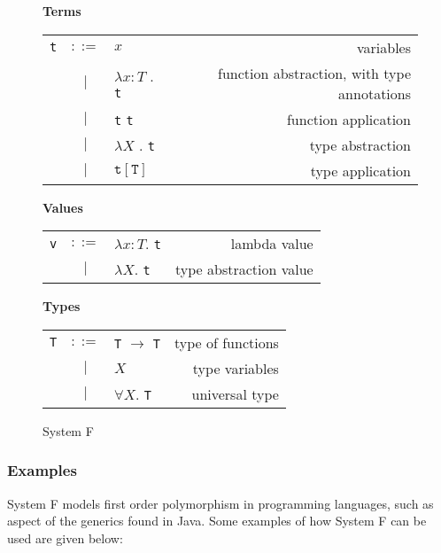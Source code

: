\begin{figure}[H]\label{fig:systemF}
    \centering
    \vspace{1cm}
    \textbf{Terms} \\
    \begin{tabular}{l c p{3cm} r}
        \texttt{t} & $ ::= $ & $ x $ &                   variables \\
      & $ | $ & $ \lambda x : T $ . \texttt{t} &          function abstraction, with type annotations \\
      & $ | $ & \texttt{t} \texttt{t} &          function application \\
      & $ | $ & $ \lambda X $ . \texttt{t} &          type abstraction \\
      & $ | $ & $ \texttt{t} [\texttt{T}] $ &          type application \\
    \end{tabular}

    \vspace{1cm}
    \textbf{Values} \\
    \begin{tabular}{l c p{3cm} r}
        \texttt{v} & $ ::= $ & $ \lambda x : T . $ \texttt{t} &                   lambda value \\
      & $ | $ & $ \lambda X . $ \texttt{t} &   type abstraction value \\
    \end{tabular}

    \vspace{1cm}
    \textbf{Types} \\
    \begin{tabular}{l c p{3cm} r}
        \texttt{T} & $ ::= $ & \texttt{T} $ \rightarrow $ \texttt{T} &      type of functions \\
        & $ | $ & $ X $ &       type variables \\
        & $ | $ & $ \forall X . $ \texttt{T} &       universal type \\
    \end{tabular}

    \caption{System F}
\end{figure}

\subsubsection{Examples}
System F models first order polymorphism in programming languages, such as aspect of
the generics found in Java. Some examples of how System F can be used are given
below:

